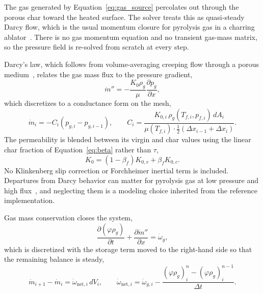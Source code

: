 \documentclass[11pt]{report}
\begin{document}
The gas generated by Equation~\eqref{eq:gas_source} percolates out through the
porous char toward the heated surface. The solver treats this as quasi-steady
Darcy flow, which is the usual momentum closure for pyrolysis gas in a charring
ablator~\cite{weng2014pyrolysisgas}. There is no gas momentum equation and no
transient gas-mass matrix, so the pressure field is re-solved from scratch at
every step.

Darcy's law, which follows from volume-averaging creeping flow through a porous
medium~\cite{whitaker1986darcy}, relates the gas mass flux to the pressure
gradient,
\begin{equation}
\dot m'' = -\frac{K_0 \rho_g}{\mu} \frac{\partial p_g}{\partial x},
\label{eq:darcy}
\end{equation}
which discretizes to a conductance form on the mesh,
\begin{equation}
\dot m_i = -C_i \left(p_{g,i} - p_{g,i-1}\right),
\qquad
C_i = \frac{K_{0,i}\, \rho_g(T_{f,i}, p_{f,i})\, dA_i}
{\mu(T_{f,i}) \cdot \tfrac12\left(\Delta x_{i-1} + \Delta x_i\right)} .
\label{eq:darcy_discrete}
\end{equation}
The permeability is blended between its virgin and char values using the linear
char fraction of Equation~\eqref{eq:beta} rather than $\tau$,
\begin{equation}
K_0 = (1 - \beta_f) K_{0,v} + \beta_f K_{0,c} .
\end{equation}
No Klinkenberg slip correction or Forchheimer inertial term is included. Departures
from Darcy behavior can matter for pyrolysis gas at low pressure and high
flux~\cite{martin2010nondarcian}, and neglecting them is a modeling choice
inherited from the reference implementation.

Gas mass conservation closes the system,
\begin{equation}
\frac{\partial (\varphi \rho_g)}{\partial t} + \frac{\partial \dot m''}{\partial x}
= \dot\omega_g ,
\end{equation}
which is discretized with the storage term moved to the right-hand side so that
the remaining balance is steady,
\begin{equation}
\dot m_{i+1} - \dot m_i = \dot\omega_{\mathrm{net},i}\, dV_i,
\qquad
\dot\omega_{\mathrm{net},i} = \dot\omega_{g,i}
- \frac{\left(\varphi \rho_g\right)^{n}_i - \left(\varphi \rho_g\right)^{n-1}_i}{\Delta t}.
\label{eq:gas_mass}
\end{equation}
\end{document}
